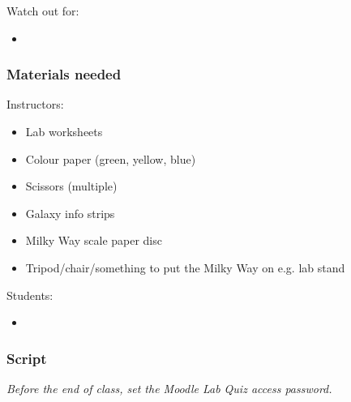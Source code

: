 \documentclass[12pt]{article}
\begin{document}
\noindent
Watch out for:
\begin{itemize}
\item 
\end{itemize}


\subsubsection{Materials needed}

Instructors:
\begin{itemize}
\item Lab worksheets
\item Colour paper (green, yellow, blue)
\item Scissors (multiple)
\item Galaxy info strips
\item Milky Way scale paper disc
\item Tripod/chair/something to put the Milky Way on e.g. lab stand
\end{itemize}

\noindent
Students:
\begin{itemize}
\item 
\end{itemize}


\subsubsection{Script}


\emph{Before the end of class, set the Moodle Lab Quiz access password.}
\end{document}
